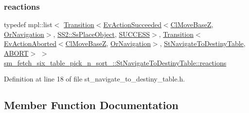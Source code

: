 \subsubsection{\texorpdfstring{reactions}{reactions}}
{\footnotesize\ttfamily typedef mpl\+::list$<$ \hyperlink{classsmacc_1_1Transition}{Transition}$<$\hyperlink{structsmacc_1_1default__events_1_1EvActionSucceeded}{Ev\+Action\+Succeeded}$<$\hyperlink{classcl__move__base__z_1_1ClMoveBaseZ}{Cl\+Move\+BaseZ}, \hyperlink{classsm__fetch__six__table__pick__n__sort__1_1_1OrNavigation}{Or\+Navigation}$>$, \hyperlink{structsm__fetch__six__table__pick__n__sort__1_1_1SS2_1_1SsPlaceObject}{S\+S2\+::\+Ss\+Place\+Object}, \hyperlink{structsmacc_1_1default__transition__tags_1_1SUCCESS}{S\+U\+C\+C\+E\+SS}$>$, \hyperlink{classsmacc_1_1Transition}{Transition}$<$\hyperlink{structsmacc_1_1default__events_1_1EvActionAborted}{Ev\+Action\+Aborted}$<$\hyperlink{classcl__move__base__z_1_1ClMoveBaseZ}{Cl\+Move\+BaseZ}, \hyperlink{classsm__fetch__six__table__pick__n__sort__1_1_1OrNavigation}{Or\+Navigation}$>$, \hyperlink{structsm__fetch__six__table__pick__n__sort__1_1_1StNavigateToDestinyTable}{St\+Navigate\+To\+Destiny\+Table}, \hyperlink{structsmacc_1_1default__transition__tags_1_1ABORT}{A\+B\+O\+RT}$>$ $>$ \hyperlink{structsm__fetch__six__table__pick__n__sort__1_1_1StNavigateToDestinyTable_af03fcd03ff9b2c4288e00548642fa64c}{sm\+\_\+fetch\+\_\+six\+\_\+table\+\_\+pick\+\_\+n\+\_\+sort\+\_\+::\+St\+Navigate\+To\+Destiny\+Table\+::reactions}}



Definition at line 18 of file st\+\_\+navigate\+\_\+to\+\_\+destiny\+\_\+table.\+h.



\subsection{Member Function Documentation}
\mbox{\label{structsm__fetch__six__table__pick__n__sort__1_1_1StNavigateToDestinyTable_a9243186869228196101ca60180b9b1b1}} 
